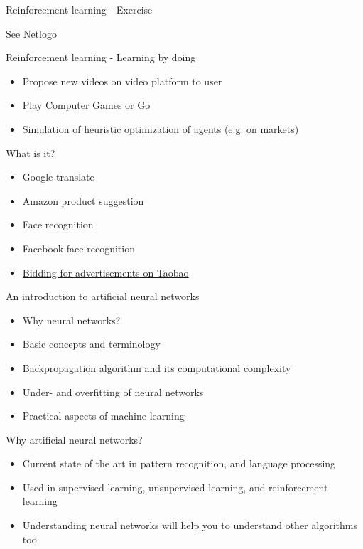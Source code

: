 \documentclass[color=usenames,dvipsnames]{beamer}
\begin{document}
\begin{frame}{Reinforcement learning - Exercise} 

See Netlogo

\end{frame}

\begin{frame}{Reinforcement learning - Learning by doing} 

\begin{itemize}
\item Propose new videos on video platform to user
\item Play Computer Games or Go
\item Simulation of heuristic optimization of agents (e.g. on markets)
\end{itemize}

\end{frame}

\begin{frame}{What is it?} 

\begin{itemize}
\item Google translate
\item Amazon product suggestion
\item Face recognition
\item Facebook face recognition
\item \href{https://arxiv.org/pdf/1802.09756.pdf}{{Bidding for advertisements on Taobao}}
\end{itemize}

\end{frame}

\begin{frame}{An introduction to artificial neural networks} 

\begin{itemize}
\item Why neural networks?
\item Basic concepts and terminology
\item Backpropagation algorithm and its computational complexity
\item Under- and overfitting of neural networks
\item Practical aspects of machine learning
\end{itemize}

\end{frame}


\begin{frame}{Why artificial neural networks?} 

\begin{itemize}
\item Current state of the art in pattern recognition, and language processing
\item Used in supervised learning, unsupervised learning, and reinforcement learning
\item Understanding neural networks will help you to understand other algorithms too

\end{itemize}

\end{frame}
\end{document}
